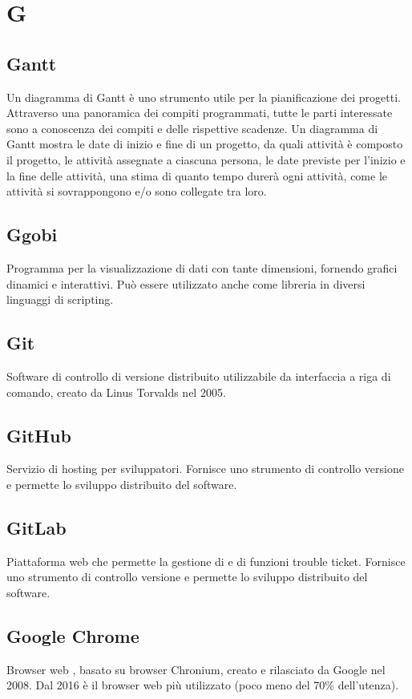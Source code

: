 \section*{G}
\markright{}

\subsection*{Gantt}
Un diagramma di Gantt è uno strumento utile per la pianificazione dei progetti. Attraverso una panoramica dei compiti programmati, tutte le parti interessate sono a conoscenza dei compiti e delle rispettive scadenze. Un diagramma di Gantt mostra le date di inizio e fine di un progetto, da quali attività è composto il progetto, le attività assegnate a ciascuna persona, le date previste per l'inizio e la fine delle attività, una stima di quanto tempo durerà ogni attività, come le attività si sovrappongono e/o sono collegate tra loro.

\subsection*{Ggobi}
Programma  per la visualizzazione di dati con tante dimensioni, fornendo grafici dinamici e interattivi. Può essere utilizzato anche come libreria in diversi linguaggi di scripting.

\subsection*{Git}
Software di controllo di versione distribuito utilizzabile da interfaccia a riga di comando, creato da Linus Torvalds nel 2005. 

\subsection*{GitHub}
Servizio di hosting per sviluppatori. Fornisce uno strumento di controllo versione e permette lo sviluppo distribuito del software.

\subsection*{GitLab}
Piattaforma web che permette la gestione di   e di funzioni trouble ticket. Fornisce uno strumento di controllo versione e permette lo sviluppo distribuito del software.

\subsection*{Google Chrome}
Browser web , basato su browser Chronium, creato e rilasciato da Google nel 2008. Dal 2016 è il browser web più utilizzato (poco meno del 70\% dell'utenza).